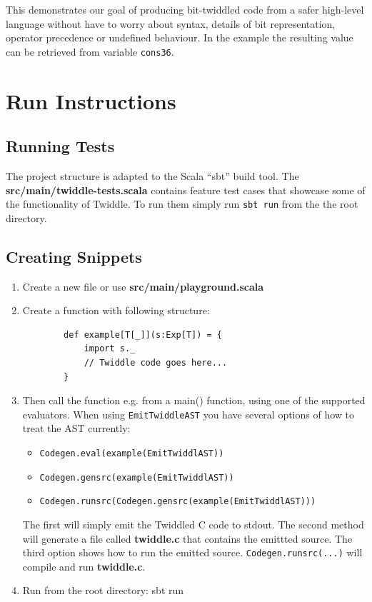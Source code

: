 \documentclass{article}
\begin{document}
This demonstrates our goal of producing bit-twiddled code from a safer high-level language without have to worry about syntax, details of bit representation, operator precedence or undefined behaviour. In the example  the resulting value can be retrieved from variable \texttt{cons36}.

\section{Run Instructions}
\subsection{Running Tests}
The project structure is adapted to the Scala ``sbt'' build tool. The \textbf{src/main/twiddle-tests.scala} contains feature test cases that showcase some of the functionality of Twiddle. To run them simply
run \texttt{sbt run} from the the root directory.

\subsection{Creating Snippets}
\begin{enumerate}
	\item Create a new file or use \textbf{src/main/playground.scala}
	\item Create a function with following structure:
	\begin{verbatim}
		def example[T[_]](s:Exp[T]) = {
		    import s._
		    // Twiddle code goes here...
		}
	\end{verbatim}
	\item Then call the function e.g. from a main() function, using one of the supported evaluators. When using \texttt{EmitTwiddleAST} you have several options of how to treat the AST currently:
	\begin{itemize}
		\item \texttt{Codegen.eval(example(EmitTwiddlAST))}
		\item \texttt{Codegen.gensrc(example(EmitTwiddlAST))}
		\item \texttt{Codegen.runsrc(Codegen.gensrc(example(EmitTwiddlAST)))}
	\end{itemize}
	The first will simply emit the Twiddled C code to stdout. The second method will generate a file called	\textbf{twiddle.c} that contains the emittted source. The third option shows how to run the emitted source. \texttt{Codegen.runsrc(...)} will compile and run \textbf{twiddle.c}.
	\item Run from the root directory: sbt run
\end{enumerate}
\end{document}
